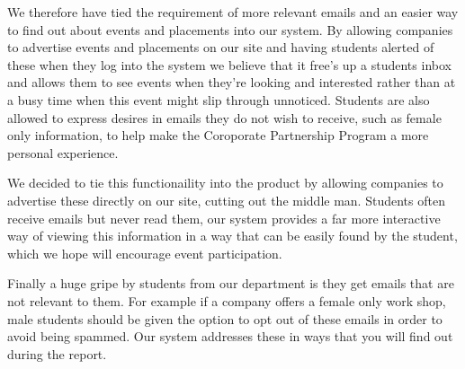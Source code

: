 We therefore have tied the requirement of more relevant emails and an easier way to find out about events and placements into our system. By allowing companies to advertise events and placements on our site and having students alerted of these when they log into the system we believe that it free's
up a students inbox and allows them to see events when they're looking and interested rather than at a busy time when this event might slip through
unnoticed.
Students are also allowed to express desires in emails they do not wish to receive, such as female only information, to help make the Coroporate Partnership Program a more personal experience. 


We decided to tie this functionaility into the product by allowing companies to advertise these directly on our site, cutting out the middle man.
Students often receive emails but never read them, our system provides a far more interactive way of viewing this information in a way that can be easily found by the student, which we hope will encourage event participation.

Finally a huge gripe by students from our department is they get emails that are not relevant to them. For example if a company offers a female only work shop, male students should be given the option to opt out of these emails in order to avoid being spammed. Our system addresses these in ways that you will find out during the report.